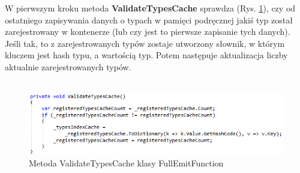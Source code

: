 \documentclass[12pt]{article}
\begin{document}
W pierwszym kroku metoda \textbf{ValidateTypesCache} sprawdza (Rys. \ref{fig:FullEmitFunction_ValidateTypesCache}), czy od ostatniego zapisywania danych o typach w pamięci podręcznej jakiś typ został zarejestrowany w kontenerze (lub czy jest to pierwsze zapisanie tych danych). Jeśli tak, to z zarejestrowanych typów zostaje utworzony słownik, w którym kluczem jest hash typu, a wartością typ. Potem następuje aktualizacja liczby aktualnie zarejestrowanych typów.\\ \\
\begin{figure}[H]
	\begin{center}
  		\includegraphics{FullEmitFunction_ValidateTypesCache.png}
  		\caption{Metoda ValidateTypesCache klasy FullEmitFunction}
  		\label{fig:FullEmitFunction_ValidateTypesCache}
	\end{center}
\end{figure}
\end{document}

